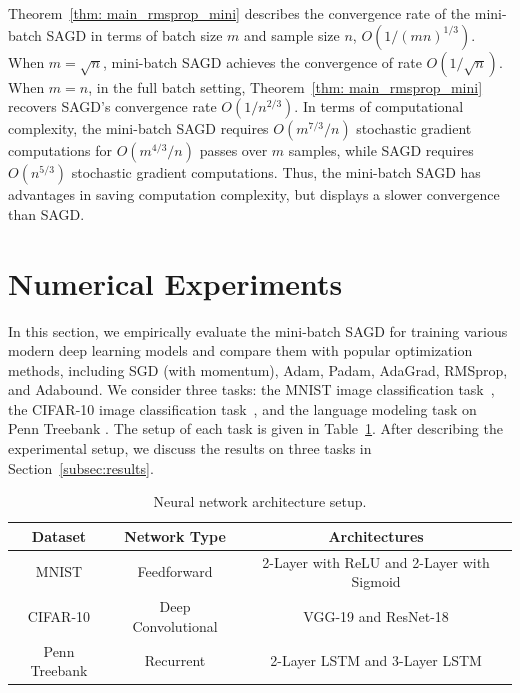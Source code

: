 \documentclass[11pt]{article}
\begin{document}
Theorem~\ref{thm: main_rmsprop_mini} 
describes the convergence rate of the mini-batch \textsc{SAGD} in terms of batch size $m$ and sample size $n$, \ie $O(1/(mn)^{1/3})$. 
When $m = \sqrt{n}$, mini-batch \textsc{SAGD} achieves the convergence of rate $O(1/\sqrt{n})$. When $m=n$, \ie in the full batch setting, Theorem~\ref{thm: main_rmsprop_mini} recovers \textsc{SAGD}'s convergence rate  $O(1/n^{2/3})$. 
In terms of computational complexity, the mini-batch \textsc{SAGD} requires $O(m^{7/3}/n)$ stochastic gradient computations for $O(m^{4/3}/n)$ passes over $m$ samples, while \textsc{SAGD} requires $O(n^{5/3})$ stochastic gradient computations. Thus, the mini-batch \textsc{SAGD} has advantages in saving computation complexity, but displays a slower convergence than \textsc{SAGD}.
\vspace{-0.05in}
\section{Numerical Experiments} \label{sec: experiment}
\vspace{-0.05in}
In this section, we empirically evaluate the mini-batch \textsc{SAGD}
for training various modern deep
learning models and compare them with popular optimization methods, including SGD (with momentum), Adam, Padam,  AdaGrad,  RMSprop, and Adabound. 
We consider three tasks: the MNIST image classification task~\citep{lebo1998}, the CIFAR-10 image
classification task~\citep{krhi2009}, and the language modeling task on Penn Treebank
\citep{mama1993}. The setup of each task is given in Table~\ref{tab::network_setup}. 
After describing the experimental setup, we discuss the results on three tasks in Section~\ref{subsec:results}.\vspace{-0.05in}
\begin{table}[H]
	\centering
		\caption{Neural network architecture setup.}
	\label{tab::network_setup}
	\begin{tabular}{ccc}	
	\toprule[2pt]
	\textbf{Dataset} & \textbf{Network Type}    & \textbf{Architectures} \\ 	
	\toprule[1pt]
		MNIST            & Feedforward     & 2-Layer with ReLU  and 2-Layer with Sigmoid  \\
		CIFAR-10         & Deep Convolutional       & VGG-19 and ResNet-18                \\
		Penn Treebank    & Recurrent                & 2-Layer LSTM and 3-Layer LSTM      \\
		\toprule[1pt]
	\end{tabular}
\end{table}
\end{document}
